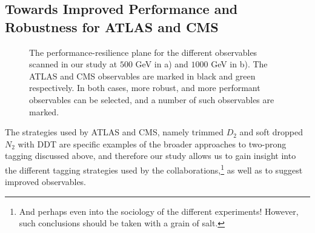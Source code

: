 \documentclass[11pt,letterpaper]{article}
\begin{document}
\subsection{Towards Improved Performance and Robustness for ATLAS and CMS}\label{sec:exp_compare}


\begin{figure}
\begin{center}
\qquad
{}
\end{center}
\caption{The performance-resilience plane for the different observables scanned in our study at $500$ GeV in a) and $1000$ GeV in b). The ATLAS and CMS observables are marked in black and green respectively. In both cases, more robust, and more performant observables can be selected, and a number of such observables are marked.
}
\label{fig:phasespace}
\end{figure}

The strategies used by ATLAS and CMS, namely trimmed $D_2$ \cite{Larkoski:2015kga,Larkoski:2014gra} and soft dropped $N_2$ \cite{Moult:2016cvt} with DDT \cite{Dolen:2016kst} are specific examples of the broader approaches to two-prong tagging discussed above, and therefore our study allows us to gain insight into the different tagging strategies used by the collaborations,\footnote{And perhaps even into the sociology of the different experiments! However, such conclusions should be taken with a grain of salt.} as well as to suggest improved observables.
\end{document}
